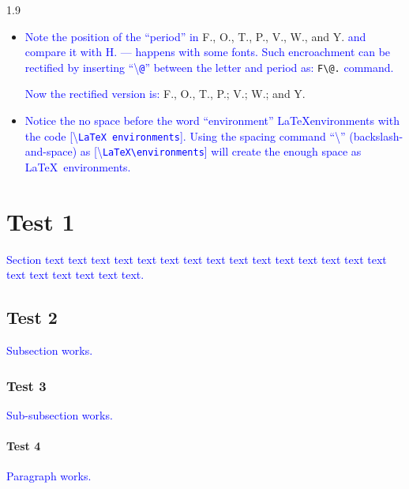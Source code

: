 \documentclass[phd]{ndsu-thesis-2022}
\newcommand\myspacing{1.9}      %
\newcommand\italk[1]{\textcolor{blue}{#1}}  %
\newcommand\cmd[1]{\textbackslash\texttt{#1}}  %
\begin{document}
\begin{spacing}{\myspacing}
\begin{itemize}
\item
\italk{Note the position of the ``period'' in} {\LARGE F., O., T., P., V., W., and Y.} \italk{and compare it with H. --- happens with some fonts. Such encroachment can be rectified by inserting ``\cmd{@}'' between the letter and period as:} {\LARGE{\verb|F\@.|}} \italk{command.} 

\italk{Now the rectified version is:} {\LARGE F\@., O\@., T\@., P\@.; V\@.; W\@.; and Y\@.}

\item
\italk{Notice the no space before the word ``environment'' \LaTeX environments with the code [\cmd{LaTeX environments}]. Using the spacing command ``\cmd{\:}'' (backslash-and-space) as [\cmd{LaTeX\textbackslash\:environments}] will create the enough space as \LaTeX\ environments.}
\end{itemize}



\section{Test 1}
\italk{Section text text text text text text text text text text text text text text text text text text text text text.}

\subsection{Test 2}
\italk{Subsection works.}

\subsubsection{Test 3}
\italk{Sub-subsection works.} 
\kant[3]

\paragraph{Test 4}
\italk{Paragraph works.} 


\renewcommand{\bibname}{REFERENCES}


\end{spacing}
\end{document}
